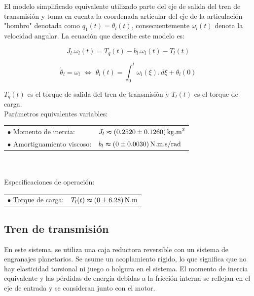 \documentclass{article}
\begin{document}
    El modelo simplificado equivalente utilizado parte del eje de salida del tren de transmisión y toma en 
    cuenta la coordenada articular del eje de la articulación "hombro" denotada como $q_1(t) = \theta_l(t)$, 
    consecuentemente $\omega_l(t)$ denota la velocidad angular. La ecuación que describe este modelo es:

    \begin{equation}\label{eq:carga_mecanica1}
        J_{l}.\dot{\omega}_{l}(t) = T_{q}(t)-b_{l}.\omega_{l}(t)-T_{l}(t)
    \end{equation}

    \begin{equation}\label{eq:carga_mecanica2}
        \dot{\theta}_{l} = \omega_{l} \,\, \Leftrightarrow \,\, \theta_{l}(t) = \int_{0}^{t} \omega_{l}(\xi). \,d\xi + \theta_{l}(0)
    \end{equation}

    $T_q(t)$ es el torque de salida del tren de transmisión y $T_l(t)$ es el torque de carga.\\

    \noindent Parámetros equivalentes variables:\\

    \begin{tabular}{@{} p{} p{} @{}}
        \(\bullet\) Momento de inercia: & \(J_l \thickapprox (0.2520 \pm 0.1260) \, \text{kg.m}^2\) \\
        \(\bullet\) Amortiguamiento viscoso: & \(b_l \thickapprox (0 \pm 0.0030) \, \text{N.m.s/rad}\)
    \end{tabular}
    \\\\
    \noindent Especificaciones de operación:\\

    \begin{tabular}{@{} p{} p{} @{}}
        \(\bullet\) Torque de carga: & \(T_l(t) \thickapprox (0 \pm 6.28) \, \text{N.m}\)
    \end{tabular}
    

\subsection{Tren de transmisión}

    En este sistema, se utiliza una caja reductora reversible con un sistema de engranajes planetarios. Se 
    asume un acoplamiento rígido, lo que significa que no hay elasticidad torsional ni 
    juego o holgura en el sistema. El momento de inercia equivalente y las pérdidas de energía debidas a la 
    fricción interna se reflejan en el eje de entrada y se consideran junto con el motor.
\end{document}
